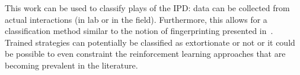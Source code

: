 \documentclass[a4paper]{article}
\begin{document}
This work can be used to classify plays of the IPD\@: data can be collected from
actual interactions (in lab or in the field). Furthermore, this allows for a
classification method similar to the notion of fingerprinting presented
in~\cite{Ashlock2008}. Trained strategies can potentially be classified as
extortionate or not or it could be possible to even constraint the reinforcement
learning approaches that are becoming prevalent in the literature.

\printbibliography
\end{document}
